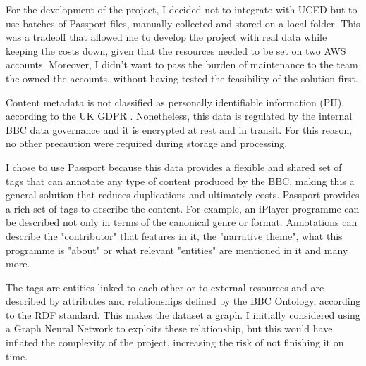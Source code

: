For the development of the project, I decided not to integrate with UCED but to use batches of Passport files, manually collected and stored
on a local folder.
This was a tradeoff that allowed me to develop the project with real data while keeping the costs down, given that the resources needed to
be set on two AWS accounts. Moreover, I didn't want to pass the burden of maintenance to the team the owned the accounts, without having tested
the feasibility of the solution first.

Content metadata is not classified as personally identifiable information (PII), according to the UK GDPR \cite{UKGDPR}. Nonetheless,
this data is regulated by the internal BBC data governance and it is encrypted at rest and in transit. For this reason, no other precaution
were required during storage and processing.

I chose to use Passport because this data provides a flexible and shared set of tags that can annotate any type of content produced by the BBC,
making this a general solution that reduces duplications and ultimately costs. Passport provides a rich set of tags to describe
the content. For example, an iPlayer programme can be described not only in terms of the canonical genre or format. Annotations can describe
the "contributor" that features in it, the "narrative theme", what this programme is "about" or what relevant "entities" are mentioned in it
and many more.

The tags are entities linked to each other or to external resources and are described by attributes and relationships defined by the BBC Ontology,
according to the RDF \cite{W3C:RDF,W3C:RDF:Concepts} standard.
This makes the dataset a graph. I initially considered using a Graph Neural Network to exploits these relationship,
but this would have inflated the complexity of the project, increasing the risk of not finishing it on time.

